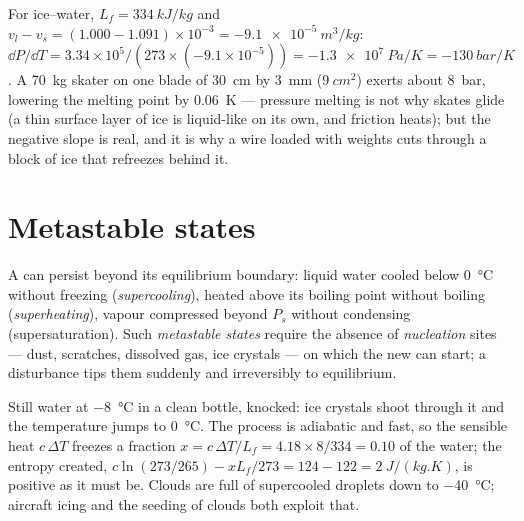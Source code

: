 \begin{example}\label{ex:b1:phase-changes:skate}
For ice--water, $L_f = \qty{334}{kJ/kg}$ and $v_l - v_s = (1.000 - 1.091)
\times 10^{-3} = \qty{-9.1e-5}{m^3/kg}$: $\dd P/\dd T = 3.34 \times 10^5/(273 \times
(-9.1 \times 10^{-5})) = \qty{-1.3e7}{Pa/K} = \qty{-130}{bar/K}$. A \qty{70}{kg}
skater on one blade of \qty{30}{cm} by \qty{3}{mm} ($\qty{9}{cm^2}$) exerts
about \qty{8}{bar}, lowering the melting point by \qty{0.06}{K} --- pressure melting is not why skates glide (a thin
surface layer of ice is liquid-like on its own, and friction heats);
but the negative slope is real, and it is why a wire loaded with
weights cuts through a block of ice that refreezes behind it.
\end{example}

\section{Metastable states}

\begin{definition}\label{def:b1:phase-changes:metastable}
A  can persist beyond its equilibrium boundary: liquid water
cooled below \qty{0}{\degreeCelsius} without freezing (\emph{supercooling}),
heated above its boiling point without boiling (\emph{superheating}),
vapour compressed beyond $P_s$ without condensing (supersaturation).
Such \emph{metastable states} require the absence of \emph{nucleation}
sites --- dust, scratches, dissolved gas, ice crystals --- on which the
new  can start; a disturbance tips them suddenly and irreversibly
to equilibrium.
\end{definition}

\begin{example}\label{ex:b1:phase-changes:supercooled}
Still water at \qty{-8}{\degreeCelsius} in a clean bottle, knocked: ice
crystals shoot through it and the temperature jumps to
\qty{0}{\degreeCelsius}. The process is adiabatic and fast, so the sensible
heat $c\,\Delta T$ freezes a fraction $x = c\,\Delta T/L_f = 4.18 \times 8/334 =
0.10$ of the water; the entropy created, $c\ln(273/265) - xL_f/273 =
124 - 122 = \qty{+2}{J/(kg.K)}$, is positive as it must be. Clouds are
full of supercooled droplets down to \qty{-40}{\degreeCelsius}; aircraft
icing and the seeding of clouds both exploit that.
\end{example}

